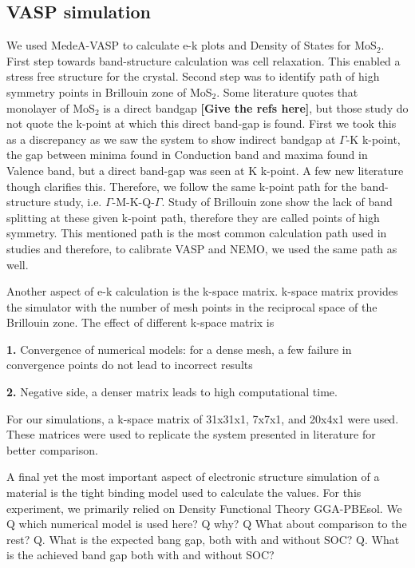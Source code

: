 \documentclass[microe]{ritthesis}
\begin{document}
\subsection{VASP simulation}
We used MedeA-VASP to calculate e-k plots and Density of States for MoS$_2$. First step towards band-structure calculation was cell relaxation. This enabled a stress free structure for the crystal. Second step was to identify path of high symmetry points in Brillouin zone of MoS$_2$. Some literature quotes that monolayer of MoS$_2$ is a direct bandgap \textbf{[Give the refs here]}, but those study do not quote the  k-point at which this direct band-gap is found. First we took this as a discrepancy as we saw the system to show indirect bandgap at $\Gamma$-K k-point, the gap between minima found in Conduction band and maxima found in Valence band, but a direct band-gap was seen at K k-point. A few new literature \cite{Eugene,Gao} though clarifies this. Therefore, we follow the same k-point path for the band-structure study, i.e. $\Gamma$-M-K-Q-$\Gamma$. Study of Brillouin zone show the lack of band splitting at these given k-point path, therefore they are called points of high symmetry. This mentioned path is the most common calculation path used in studies and therefore, to calibrate VASP and NEMO, we used the same path as well.

Another aspect of e-k calculation is the k-space matrix. k-space matrix provides the simulator with the number of mesh points in the reciprocal space of the Brillouin zone. The effect of different k-space matrix is

\textbf{1.} Convergence of numerical models: for a dense mesh, a few failure in convergence points do not lead to incorrect results

\textbf{2.} Negative side, a denser matrix leads to high computational time.

For our simulations, a k-space matrix of 31x31x1, 7x7x1, and 20x4x1 were used. These matrices were used to replicate the system presented in literature for better comparison.

A final yet the most important aspect of electronic structure simulation of a material is the tight binding model used to calculate the values. For this experiment, we primarily relied on Density Functional Theory GGA-PBEsol. We 
Q which numerical model is used here? 
Q why? 
Q What about comparison to the rest?
Q. What is the expected bang gap, both with and without SOC? 
Q. What is the achieved band gap both with and without SOC?
\end{document}
